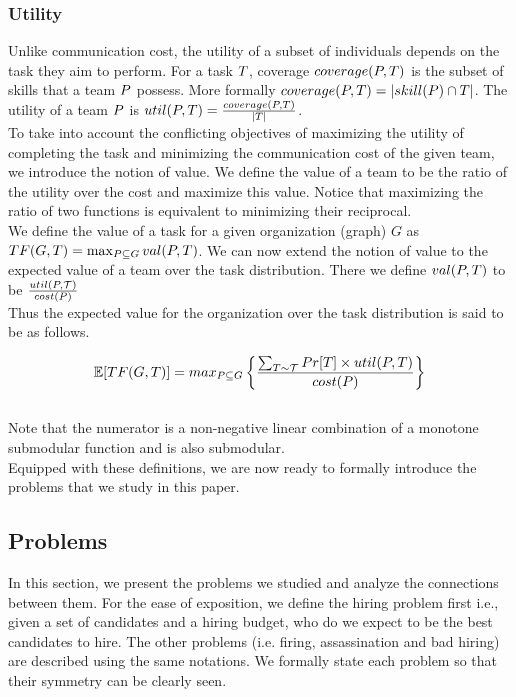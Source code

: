 \subsubsection{Utility}
Unlike communication cost, the utility of a subset of individuals depends on the task they aim to perform. 
For a task $T$, coverage $coverage(P,T)$ is the subset of skills that a team $P$ possess.
More formally $coverage(P,T) = |skill(P) \cap T|$.
The utility of a team $ P $ is ${util}(P,T) = \frac{coverage(P, T)}{|T|}$.\\
To take into account the conflicting objectives of maximizing the utility of completing the task and minimizing the communication cost of the given team, we introduce the notion of value. We define the value of a team to be the ratio of the utility over the cost and maximize this value. Notice that maximizing the ratio of two functions is equivalent to minimizing their reciprocal. \\
We define the value of a task for a given organization (graph) $G$ as $TF(G,T) = \max_{P \subseteq G}{val(P,T)}$. We can now extend the notion of value to the expected value of a team over the task distribution. There we define $val(P,T)$ to be $\frac{{util}(P,\mathcal{T})}{cost(P)} $ \\
Thus the expected value for the organization over the task distribution is said to be as follows.

$$\mathbb{E}[TF(G,T)] = max_{P \subseteq G} \left\{ \frac{\sum_{T \sim \mathcal{T} } Pr[T] \times {util}(P, T)} {cost(P)} \right\} $$ \\
Note that the numerator is a non-negative linear combination of a monotone submodular function and is also submodular.\\
Equipped with these definitions, we are now ready to formally introduce the problems that we study in this paper.

\subsection{Problems}

In this section, we present the problems we studied and analyze the connections between them. For the ease of exposition, we define the hiring problem first i.e., given a set of candidates and a hiring budget, who do we expect to be the best candidates to hire. The other problems (i.e. firing, assassination and bad hiring) are described using the same notations. We formally state each problem so that their symmetry can be clearly seen.

